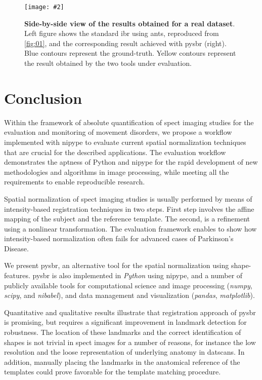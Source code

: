 \documentclass{frontiers}
\newcommand{\insertgraphic}[2]{\texttt{[image: \#2]}}
\newcommand{\insertgraphic}[2]{\texttt{[image: \#2]}}
\begin{document}
\begin{figure}
\centering 
\insertgraphic{width=1.0\linewidth}{figures/06-results-mri-pysbr}
\caption{ \label{fig:real_dataset_result} 
  \textbf{Side-by-side view of the results obtained for a real dataset}.
  Left figure shows the standard \gls*{ibr} using \gls*{ants}, reproduced from
  \autoref{fig:01}, and the corresponding result achieved with \gls*{pysbr}
  (right). Blue contours represent the ground-truth. Yellow contours represent
  the result obtained by the two tools under evaluation.
}
\end{figure}


\section{Conclusion}
\label{sec:conclusion}
Within the framework of absolute quantification of \gls*{spect}
  imaging studies for the evaluation and monitoring of movement
  disorders, we propose a workflow implemented with \gls*{nipype}
  to evaluate current spatial normalization techniques that are
  crucial for the described applications.
The evaluation workflow demonstrates the aptness of Python 
  and \gls*{nipype} for the rapid development of new methodologies
  and algorithms in image processing, while meeting
  all the requirements to enable reproducible research.

Spatial normalization of \gls*{spect} imaging studies is
  usually performed by means of intensity-based registration
  techniques in two steps.
First step involves the affine mapping of the subject and the
  reference template.
The second, is a refinement using a nonlinear transformation.
The evaluation framework enables to show 
  how intensity-based normalization often fails
  for advanced cases of Parkinson's Disease.

We present \gls*{pysbr}, an alternative tool for the
  spatial normalization using shape-features.
\Gls*{pysbr} is also implemented in \emph{Python} using
  \gls*{nipype}, and a number of publicly available tools
  for computational science and image processing
  (\emph{numpy}, \emph{scipy}, and \emph{nibabel}),
  and data management and visualization (\emph{pandas},
  \emph{matplotlib}).
  
Quantitative and qualitative results illustrate that registration approach
  of \gls*{pysbr} is promising, but requires a significant improvement
  in landmark detection for robustness.
The location of these landmarks and the correct identification of
  shapes is not trivial in \gls*{spect} images for a number of reasons,
  for instance the low resolution and the loose representation of
  underlying anatomy in \glspl*{datscan}.
In addition, manually placing the landmarks in the anatomical reference of the 
  templates could prove favorable for the template matching procedure.
 
\end{document}
